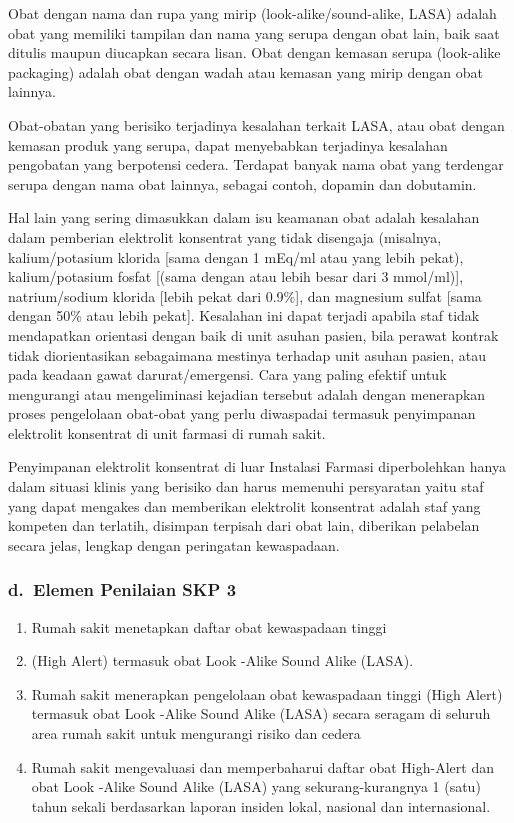 \documentclass[
]{book}
\providecommand{\tightlist}{%
  \setlength{\itemsep}{0pt}\setlength{\parskip}{0pt}}
\begin{document}
Obat dengan nama dan rupa yang mirip (look-alike/sound-alike, LASA) adalah obat yang memiliki tampilan dan nama yang serupa dengan obat lain, baik saat ditulis maupun diucapkan secara lisan. Obat dengan kemasan serupa (look-alike packaging) adalah obat dengan wadah atau kemasan yang mirip dengan obat lainnya.

Obat-obatan yang berisiko terjadinya kesalahan terkait LASA, atau obat dengan kemasan produk yang serupa, dapat menyebabkan terjadinya kesalahan pengobatan yang berpotensi cedera. Terdapat banyak nama obat yang terdengar serupa dengan nama obat lainnya, sebagai contoh, dopamin dan dobutamin.

Hal lain yang sering dimasukkan dalam isu keamanan obat adalah kesalahan dalam pemberian elektrolit konsentrat yang tidak disengaja (misalnya, kalium/potasium klorida {[}sama dengan 1 mEq/ml atau yang lebih pekat), kalium/potasium fosfat {[}(sama dengan atau lebih besar dari 3 mmol/ml){]}, natrium/sodium klorida {[}lebih pekat dari 0.9\%{]}, dan magnesium sulfat {[}sama dengan 50\% atau lebih pekat{]}. Kesalahan ini dapat terjadi apabila staf tidak mendapatkan orientasi dengan baik di unit asuhan pasien, bila perawat kontrak tidak diorientasikan sebagaimana mestinya terhadap unit asuhan pasien, atau pada keadaan gawat darurat/emergensi. Cara yang paling efektif untuk mengurangi atau mengeliminasi kejadian tersebut adalah dengan menerapkan proses pengelolaan obat-obat yang perlu diwaspadai termasuk penyimpanan elektrolit konsentrat di unit farmasi di rumah sakit.

Penyimpanan elektrolit konsentrat di luar Instalasi Farmasi diperbolehkan hanya dalam situasi klinis yang berisiko dan harus memenuhi persyaratan yaitu staf yang dapat mengakes dan memberikan elektrolit konsentrat adalah staf yang kompeten dan terlatih, disimpan terpisah dari obat lain, diberikan pelabelan secara jelas, lengkap dengan peringatan kewaspadaan.

\hypertarget{d.-elemen-penilaian-skp-3}{%
\subsubsection*{d.~Elemen Penilaian SKP 3}\label{d.-elemen-penilaian-skp-3}}

\begin{enumerate}
\def\labelenumi{\arabic{enumi}.}
\tightlist
\item
  Rumah sakit menetapkan daftar obat kewaspadaan tinggi
\item
  (High Alert) termasuk obat Look -Alike Sound Alike (LASA).
\item
  Rumah sakit menerapkan pengelolaan obat kewaspadaan tinggi (High Alert) termasuk obat Look -Alike Sound Alike (LASA) secara seragam di seluruh area rumah sakit untuk mengurangi risiko dan cedera
\item
  Rumah sakit mengevaluasi dan memperbaharui daftar obat High-Alert dan obat Look -Alike Sound Alike (LASA) yang sekurang-kurangnya 1 (satu) tahun sekali berdasarkan laporan insiden lokal, nasional dan internasional.
\end{enumerate}
\end{document}

